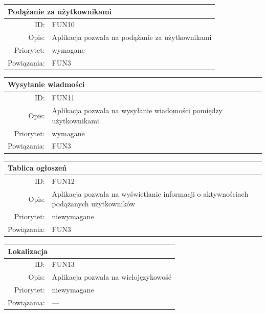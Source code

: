 \begin{center}
      \begin{tabular}{rp{10cm}}
	      \multicolumn{2}{l}{\textbf{Podążanie za użytkownikami}} \\
	      \hline
	      ID: & FUN10 \\
	      Opis: & Aplikacja pozwala na podążanie za użytkownikami \\
	      Priorytet: & wymagane \\
	      Powiązania: & FUN3 \\
    \end{tabular}
\end{center}

\begin{center}
      \begin{tabular}{rp{10cm}}
	      \multicolumn{2}{l}{\textbf{Wysyłanie wiadmości}} \\
	      \hline
	      ID: & FUN11 \\
	      Opis: & Aplikacja pozwala na wysyłanie wiadomości pomiędzy użytkownikami \\
	      Priorytet: & wymagane \\
	      Powiązania: & FUN3 \\
    \end{tabular}
\end{center}

\begin{center}
      \begin{tabular}{rp{10cm}}
	      \multicolumn{2}{l}{\textbf{Tablica ogłoszeń}} \\
	      \hline
	      ID: & FUN12 \\
	      Opis: & Aplikacja pozwala na wyświetlanie informacji o aktywnościach podążanych użytkowników \\
	      Priorytet: & niewymagane \\
	      Powiązania: & FUN3 \\
    \end{tabular}
\end{center}

\begin{center}
      \begin{tabular}{rp{10cm}}
	      \multicolumn{2}{l}{\textbf{Lokalizacja}} \\
	      \hline
	      ID: & FUN13 \\
	      Opis: & Aplikacja pozwala na wielojęzykowość\\
	      Priorytet: & niewymagane \\
	      Powiązania: & --- \\
    \end{tabular}
\end{center}

